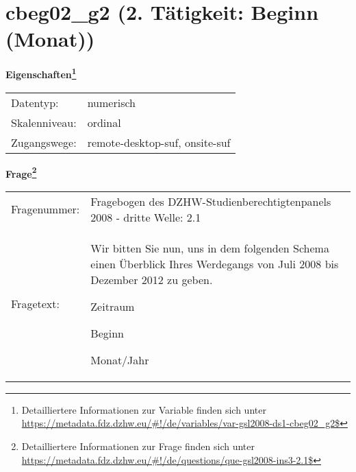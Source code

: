 
    \setcounter{footnote}{0}

    \vspace*{-1.8cm}
	\section{cbeg02\_g2 (2. Tätigkeit: Beginn (Monat))}
	\label{section:cbeg02_g2}



    \vspace*{0.5cm}
    \noindent\textbf{Eigenschaften\footnote{Detailliertere Informationen zur Variable finden sich unter
		\url{https://metadata.fdz.dzhw.eu/\#!/de/variables/var-gsl2008-ds1-cbeg02_g2$}}}\\
	\begin{tabularx}{\hsize}{@{}lX}
	Datentyp: & numerisch \\
	Skalenniveau: & ordinal \\
	Zugangswege: &
	  remote-desktop-suf, 
	  onsite-suf
 \\
    \end{tabularx}



				\vspace*{0.5cm}
                \noindent\textbf{Frage\footnote{Detailliertere Informationen zur Frage finden sich unter
		              \url{https://metadata.fdz.dzhw.eu/\#!/de/questions/que-gsl2008-ins3-2.1$}}}\\
				\begin{tabularx}{\hsize}{@{}lX}
					Fragenummer: &
					  Fragebogen des DZHW-Studienberechtigtenpanels 2008 - dritte Welle:
					  2.1
 \\
					Fragetext: & Wir bitten Sie nun, uns in dem folgenden Schema einen Überblick Ihres Werdegangs von Juli 2008 bis Dezember 2012 zu geben.\par  Zeitraum\par  Beginn\par  Monat/Jahr \\
				\end{tabularx}





